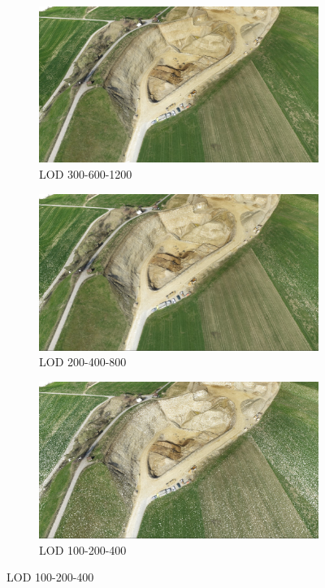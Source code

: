 \begin{figure}[h]
    \centering
    
    \begin{subfigure}{0.45\textwidth}
        \centering
        \includegraphics[width=\textwidth]{lod-landscape-300.jpg}
        \caption{LOD 300-600-1200}
        \label{fig:results:lod-landscape-300}
    \end{subfigure}
    \begin{subfigure}{0.45\textwidth}
        \centering
        \includegraphics[width=\textwidth]{lod-landscape-200.jpg}
        \caption{LOD 200-400-800}
        \label{fig:results:lod-landscape-200}
    \end{subfigure}
    
    \begin{subfigure}{0.45\textwidth}
        \centering
        \includegraphics[width=\textwidth]{lod-landscape-100.jpg}
        \caption{LOD 100-200-400}
        \label{fig:results:lod-landscape-100}
    \end{subfigure}
    

\end{figure}
